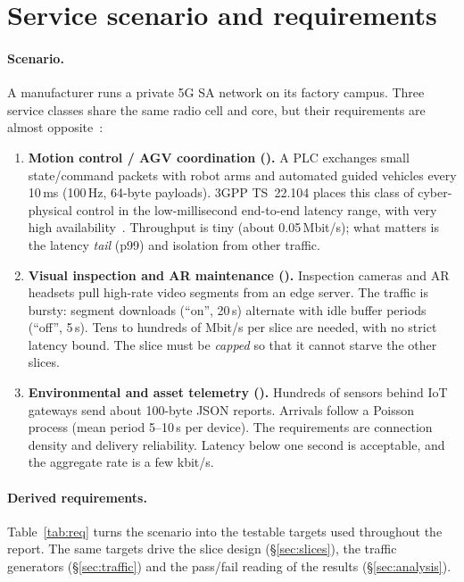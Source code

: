 \section{Service scenario and requirements}\label{sec:scenario}
\paragraph{Scenario.} A manufacturer runs a private 5G SA network on its factory campus.
Three service classes share the same radio cell and core, but their requirements are almost
opposite~\cite{itu2083,ts22261}:
\begin{enumerate}
\item \textbf{Motion control / AGV coordination ().} A PLC exchanges small
  state/command packets with robot arms and automated guided vehicles every 10\,ms (100\,Hz,
  64-byte payloads). 3GPP TS~22.104 places this class of cyber-physical control in the
  low-millisecond end-to-end latency range, with very high availability~\cite{ts22104}.
  Throughput is tiny (about 0.05\,Mbit/s); what matters is the latency \emph{tail} (p99) and
  isolation from other traffic.
\item \textbf{Visual inspection and AR maintenance ().} Inspection cameras and AR
  headsets pull high-rate video segments from an edge server. The traffic is bursty: segment
  downloads (``on'', 20\,s) alternate with idle buffer periods (``off'', 5\,s). Tens to
  hundreds of Mbit/s per slice are needed, with no strict latency bound. The slice must be
  \emph{capped} so that it cannot starve the other slices.
\item \textbf{Environmental and asset telemetry ().} Hundreds of sensors behind
  IoT gateways send about 100-byte JSON reports. Arrivals follow a Poisson process (mean period
  5--10\,s per device). The requirements are connection density and delivery reliability.
  Latency below one second is acceptable, and the aggregate rate is a few kbit/s.
\end{enumerate}

\paragraph{Derived requirements.} Table~\ref{tab:req} turns the scenario into the
testable targets used throughout the report. The same targets drive the slice design
(\S\ref{sec:slices}), the traffic generators (\S\ref{sec:traffic}) and the pass/fail
reading of the results (\S\ref{sec:analysis}).

